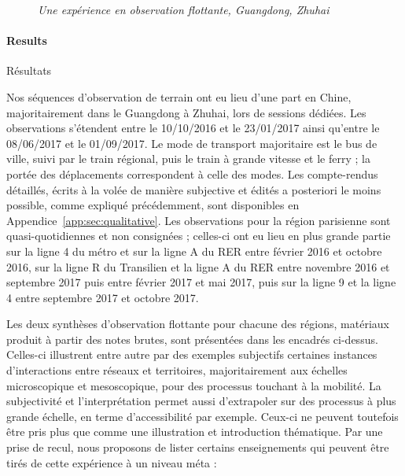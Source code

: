 \begin{figure}[h!]
\begin{mdframed}
\medskip

 \textit{Une expérience en observation flottante, Guangdong, Zhuhai}
\end{mdframed}
\end{figure}



\paragraph{Results}{Résultats}

Nos séquences d'observation de terrain ont eu lieu d'une part en Chine, majoritairement dans le Guangdong à Zhuhai, lors de sessions dédiées. Les observations s'étendent entre le 10/10/2016 et le 23/01/2017 ainsi qu'entre le 08/06/2017 et le 01/09/2017. Le mode de transport majoritaire est le bus de ville, suivi par le train régional, puis le train à grande vitesse et le ferry ; la portée des déplacements correspondent à celle des modes. Les compte-rendus détaillés, écrits à la volée de manière subjective et édités a posteriori le moins possible, comme expliqué précédemment, sont disponibles en Appendice~\ref{app:sec:qualitative}. Les observations pour la région parisienne sont quasi-quotidiennes et non consignées ; celles-ci ont eu lieu en plus grande partie sur la ligne 4 du métro et sur la ligne A du RER entre février 2016 et octobre 2016, sur la ligne R du Transilien et la ligne A du RER entre novembre 2016 et septembre 2017 puis entre février 2017 et mai 2017, puis sur la ligne 9 et la ligne 4 entre septembre 2017 et octobre 2017.


Les deux synthèses d'observation flottante pour chacune des régions, matériaux produit à partir des notes brutes, sont présentées dans les encadrés ci-dessus. Celles-ci illustrent entre autre par des exemples subjectifs certaines instances d'interactions entre réseaux et territoires, majoritairement aux échelles microscopique et mesoscopique, pour des processus touchant à la mobilité. La subjectivité et l'interprétation permet aussi d'extrapoler sur des processus à plus grande échelle, en terme d'accessibilité par exemple. Ceux-ci ne peuvent toutefois être pris plus que comme une illustration et introduction thématique. Par une prise de recul, nous proposons de lister certains enseignements qui peuvent être tirés de cette expérience à un niveau méta :

